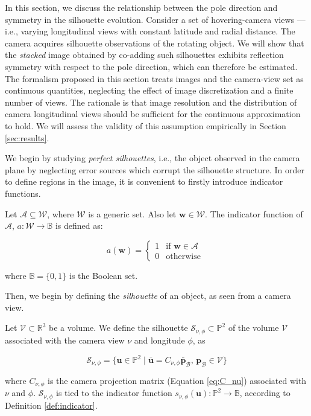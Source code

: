 In this section, we discuss the relationship between the pole direction and symmetry in the silhouette evolution. Consider a set of hovering-camera views --- i.e., varying longitudinal views with constant latitude and radial distance. The camera acquires silhouette observations of the rotating object. We will show that the \textit{stacked} image obtained by co-adding such silhouettes exhibits reflection symmetry with respect to the pole direction, which can therefore be estimated. The formalism proposed in this section treats images and the camera-view set as continuous quantities, neglecting the effect of image discretization and a finite number of views. The rationale is that image resolution and the distribution of camera longitudinal views should be sufficient for the continuous approximation to hold. We will assess the validity of this assumption empirically in Section \ref{sec:results}.

We begin by studying \textit{perfect silhouettes}, i.e., the object observed in the camera plane by neglecting error sources which corrupt the silhouette structure. In order to define regions in the image, it is convenient to firstly introduce indicator functions.

\begin{definition}
\label{def:indicator}
Let $\mathcal{A} \subseteq \mathcal{W}$, where $\mathcal{W}$ is a generic set. Also let $\mathbf{w}\in\mathcal{W}$. The indicator function of $\mathcal{A}$, $a:\mathcal{W}\rightarrow \mathbb{B}$ is defined as:
    
    \begin{equation}
        a(\mathbf{w}) = \begin{cases}
    1 & \text{if } \mathbf{w} \in \mathcal{A} \\
    0   & \text{otherwise }
  \end{cases}
    \end{equation}

    where $\mathbb{B}=\{0,1\}$ is the Boolean set.
\end{definition}

Then, we begin by defining the \textit{silhouette} of an object, as seen from a camera view.

\begin{definition}
    \label{def:s_v}
    Let $\mathcal{V}\subset \mathbb{R}^3$ be a volume. We define the silhouette $\mathcal{S}_{\nu,\phi} \subset \mathbb{P}^2$ of the volume $\mathcal{V}$ associated with the camera view $\nu$ and longitude $\phi$, as

    \begin{equation}
        \mathcal{S}_{\nu,\phi} = \{ \mathbf{u} \in \mathbb{P}^2 \; | \; \bar{\mathbf{u}} = C_{\nu,\phi} \bar{\mathbf{p}}_\mathcal{B}, \, \mathbf{p}_\mathcal{B} \in \mathcal{V} \}
    \end{equation}

where $C_{\nu,\phi}$ is the camera projection matrix (Equation \ref{eq:C_nu}) associated with $\nu$ and $\phi$. $\mathcal{S}_{\nu,\phi}$ is tied to the indicator function $s_{\nu,\phi}(\mathbf{u}): \mathbb{P}^2 \rightarrow \mathbb{B}$, according to Definition \ref{def:indicator}.
\end{definition}

